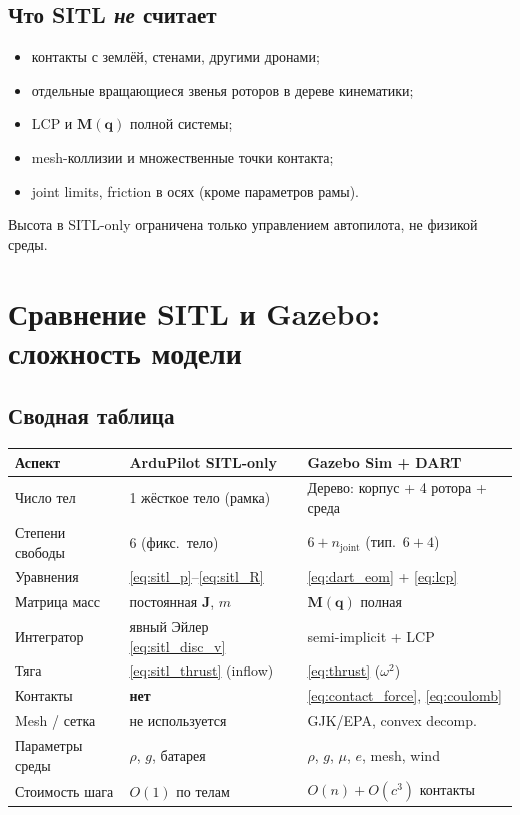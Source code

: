 \documentclass[a4paper,11pt]{article}
\newcommand{\vect}[1]{\bm{#1}}
\newcommand{\mat}[1]{\bm{#1}}
\begin{document}
\subsection{Что SITL \emph{не} считает}

\begin{itemize}
  \item контакты с землёй, стенами, другими дронами;
  \item отдельные вращающиеся звенья роторов в дереве кинематики;
  \item LCP и $\mat{M}(\vect{q})$ полной системы;
  \item mesh-коллизии и множественные точки контакта;
  \item joint limits, friction в осях (кроме параметров рамы).
\end{itemize}
Высота в SITL-only ограничена только управлением автопилота, не физикой среды.

\section{Сравнение SITL и Gazebo: сложность модели}
\label{sec:compare}

\subsection{Сводная таблица}

\begin{center}
\small
\renewcommand{\arraystretch}{1.25}
\begin{tabular}{|p{3.8cm}|p{5.2cm}|p{5.5cm}|}
\hline
\textbf{Аспект} & \textbf{ArduPilot SITL-only} & \textbf{Gazebo Sim + DART} \\
\hline
Число тел & 1 жёсткое тело (рамка) & Дерево: корпус + 4 ротора + среда \\
\hline
Степени свободы & 6 (фикс.\ тело) & $6 + n_{\mathrm{joint}}$ (тип.\ $6+4$) \\
\hline
Уравнения & \eqref{eq:sitl_p}--\eqref{eq:sitl_R} & \eqref{eq:dart_eom} + \eqref{eq:lcp} \\
\hline
Матрица масс & постоянная $\mat{J}$, $m$ & $\mat{M}(\vect{q})$ полная \\
\hline
Интегратор & явный Эйлер \eqref{eq:sitl_disc_v} & semi-implicit + LCP \\
\hline
Тяга & \eqref{eq:sitl_thrust} (inflow) & \eqref{eq:thrust} ($\omega^2$) \\
\hline
Контакты & \textbf{нет} & \eqref{eq:contact_force}, \eqref{eq:coulomb} \\
\hline
Mesh / сетка & не используется & GJK/EPA, convex decomp. \\
\hline
Параметры среды & $\rho$, $g$, батарея & $\rho$, $g$, $\mu$, $e$, mesh, wind \\
\hline
Стоимость шага & $O(1)$ по телам & $O(n) + O(c^3)$ контакты \\
\hline
\end{tabular}
\end{center}
\end{document}
